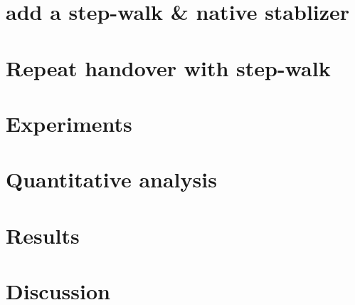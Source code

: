 \clearpage
\section{add a step-walk \& native stablizer}

\clearpage
\section{Repeat handover with step-walk}

\clearpage
\section{Experiments}

\clearpage
\section{Quantitative analysis}

\clearpage
\section{Results}

\clearpage
\section{Discussion}












